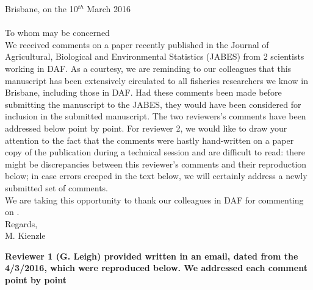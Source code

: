 \documentclass[11pt]{article}
\begin{document}
\begin{spacing}{1.2} 
\hspace{9cm} Brisbane, on the 10$^{th}$ March 2016 \\ \\

\noindent To whom may be concerned \\

We received comments on a paper \citep{Kienzle2015} recently published in the Journal of Agricultural, Biological and Environmental Statistics (JABES) from 2 scientists working in DAF. As a courtesy, we are reminding to our colleagues that this manuscript has been extensively circulated to all fisheries researchers we know in Brisbane, including those in DAF. Had these comments been made before submitting the manuscript to the JABES, they would have been considered for inclusion in the submitted manuscript. The two reviewers's comments have been addressed below point by point. For reviewer 2, we would like to draw your attention to the fact that the comments were hastly hand-written on a paper copy of the publication during a technical session and are difficult to read: there might be discrepancies between this reviewer's comments and their reproduction below; in case errors creeped in the text below, we will certainly address a newly submitted set of comments. \\

We are taking this opportunity to thank our colleagues in DAF for commenting on \cite{Kienzle2015}. \\

\noindent Regards,\\
\noindent M. Kienzle \\
\vspace{0.2cm}

{\bf Reviewer 1 (G. Leigh) provided written in an email, dated from the 4/3/2016, which were reproduced below. We addressed each comment point by point}\\

\end{spacing}
\end{document}
